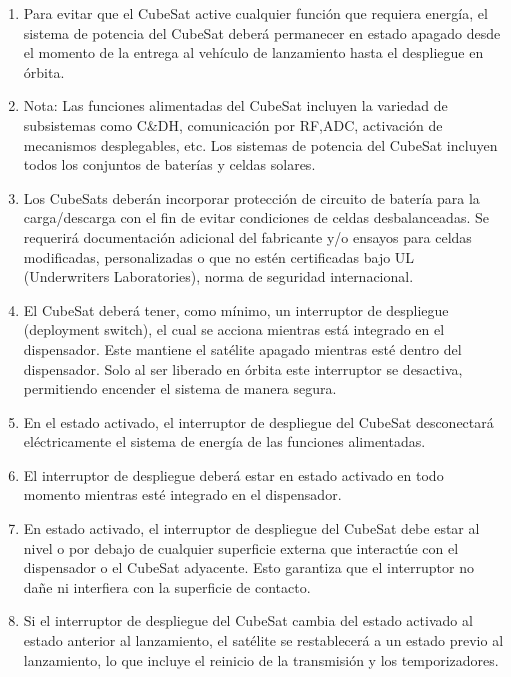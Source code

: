\documentclass[12pt]{article}
\begin{document}
	
	\begin{enumerate}
		\item Para evitar que el CubeSat active cualquier función que requiera energía, el sistema de potencia del CubeSat deberá permanecer en estado apagado desde el momento de la entrega al vehículo de lanzamiento hasta el despliegue en órbita.
		
		\item Nota: Las funciones alimentadas del CubeSat incluyen la variedad de subsistemas como C\&DH, comunicación por RF,ADC, activación de mecanismos desplegables, etc. Los sistemas de potencia del CubeSat incluyen todos los conjuntos de baterías y celdas solares.
		
		\item Los CubeSats deberán incorporar protección de circuito de batería para la carga/descarga con el fin de evitar condiciones de celdas desbalanceadas. Se requerirá documentación adicional del fabricante y/o ensayos para celdas modificadas, personalizadas o que no estén certificadas bajo UL (Underwriters Laboratories), norma de seguridad internacional.
		
		\item El CubeSat deberá tener, como mínimo, un interruptor de despliegue (deployment switch), el cual se acciona mientras está integrado en el dispensador. Este mantiene el satélite apagado mientras esté dentro del dispensador. Solo al ser liberado en órbita este interruptor se desactiva, permitiendo encender el sistema de manera segura.
		
		\item En el estado activado, el interruptor de despliegue del CubeSat desconectará eléctricamente el sistema de energía de las funciones alimentadas.
		
		\item El interruptor de despliegue deberá estar en estado activado en todo momento mientras esté integrado en el dispensador.
		
		\item En estado activado, el interruptor de despliegue del CubeSat debe estar al nivel o por debajo de cualquier superficie externa que interactúe con el dispensador o el CubeSat adyacente. Esto garantiza que el interruptor no dañe ni interfiera con la superficie de contacto.
		
		\item Si el interruptor de despliegue del CubeSat cambia del estado activado al estado anterior al lanzamiento, el satélite se restablecerá a un estado previo al lanzamiento, lo que incluye el reinicio de la transmisión y los temporizadores.
		

\end{enumerate}
\end{document}
